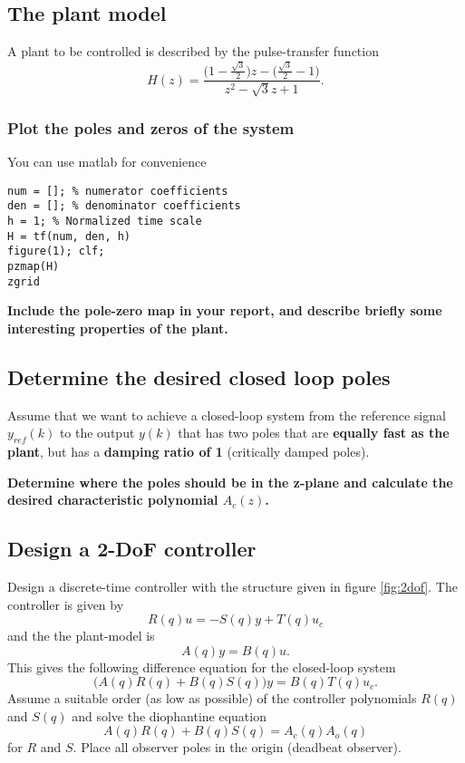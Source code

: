 \documentclass[a4paper]{scrartcl}
\begin{document}
\subsection{The plant model}
\label{sec-1-2}

A plant to be controlled is described by the pulse-transfer function
\[ H(z) = \frac{\big(1-\frac{\sqrt{3}}{2}\big)z - \big(\frac{\sqrt{3}}{2}-1\big)}{z^2 - \sqrt{3}z + 1}.\]

\subsubsection{Plot the poles and zeros of the system}
\label{sec-1-2-1}


You can use matlab for convenience 
\begin{verbatim}
num = []; % numerator coefficients
den = []; % denominator coefficients
h = 1; % Normalized time scale
H = tf(num, den, h)
figure(1); clf;
pzmap(H)
zgrid
\end{verbatim}

\textbf{Include the pole-zero map in your report, and describe briefly some interesting properties of the plant.}

\subsection{Determine the desired closed loop poles}
\label{sec-1-3}
Assume that we want to achieve a closed-loop system from the reference signal $y_{ref}(k)$ to the output $y(k)$ that has two poles that are \textbf{equally fast as the plant}, but has a \textbf{damping ratio of 1} (critically damped poles).  

\textbf{Determine where the poles should be in the z-plane and calculate the desired characteristic polynomial \(A_c(z)\).}

\subsection{Design a 2-DoF controller}
\label{sec-1-4}
Design a discrete-time controller with the structure given in figure \ref{fig:2dof}. The controller is given by 
\[ R(q)u = -S(q)y + T(q)u_c \]
and the the plant-model is
\[ A(q)y = B(q)u.\]
This gives the following difference equation for the closed-loop system
\[ \big( A(q)R(q) + B(q)S(q) \big) y = B(q)T(q) u_c. \]
Assume a suitable order (as low as possible) of the controller polynomials $R(q)$ and $S(q)$ and solve the diophantine equation 
\[ A(q)R(q) + B(q)S(q)  = A_c(q)A_o(q) \]
for $R$ and $S$. Place all observer poles in the origin (deadbeat observer).
\end{document}
